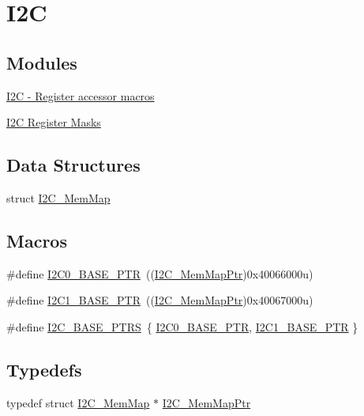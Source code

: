 \hypertarget{group___i2_c___peripheral}{}\section{I2\+C}
\label{group___i2_c___peripheral}
\subsection*{Modules}
\begin{DoxyCompactItemize}
\item 
\hyperlink{group___i2_c___register___accessor___macros}{I2\+C -\/ Register accessor macros}
\item 
\hyperlink{group___i2_c___register___masks}{I2\+C Register Masks}
\end{DoxyCompactItemize}
\subsection*{Data Structures}
\begin{DoxyCompactItemize}
\item 
struct \hyperlink{struct_i2_c___mem_map}{I2\+C\+\_\+\+Mem\+Map}
\end{DoxyCompactItemize}
\subsection*{Macros}
\begin{DoxyCompactItemize}
\item 
\#define \hyperlink{group___i2_c___peripheral_ga6db92fda81fa3b6a1c8c6a85e66d51a0}{I2\+C0\+\_\+\+B\+A\+S\+E\+\_\+\+P\+T\+R}~((\hyperlink{group___i2_c___peripheral_ga9902bc02a12982d0c37ec011b4dd89f0}{I2\+C\+\_\+\+Mem\+Map\+Ptr})0x40066000u)
\item 
\#define \hyperlink{group___i2_c___peripheral_gae13da5d584f2a4e2379db927a3f18772}{I2\+C1\+\_\+\+B\+A\+S\+E\+\_\+\+P\+T\+R}~((\hyperlink{group___i2_c___peripheral_ga9902bc02a12982d0c37ec011b4dd89f0}{I2\+C\+\_\+\+Mem\+Map\+Ptr})0x40067000u)
\item 
\#define \hyperlink{group___i2_c___peripheral_gaee17f364d6d1712b62774e6c33dea554}{I2\+C\+\_\+\+B\+A\+S\+E\+\_\+\+P\+T\+R\+S}~\{ \hyperlink{group___i2_c___peripheral_ga6db92fda81fa3b6a1c8c6a85e66d51a0}{I2\+C0\+\_\+\+B\+A\+S\+E\+\_\+\+P\+T\+R}, \hyperlink{group___i2_c___peripheral_gae13da5d584f2a4e2379db927a3f18772}{I2\+C1\+\_\+\+B\+A\+S\+E\+\_\+\+P\+T\+R} \}
\end{DoxyCompactItemize}
\subsection*{Typedefs}
\begin{DoxyCompactItemize}
\item 
typedef struct \hyperlink{struct_i2_c___mem_map}{I2\+C\+\_\+\+Mem\+Map} $\ast$ \hyperlink{group___i2_c___peripheral_ga9902bc02a12982d0c37ec011b4dd89f0}{I2\+C\+\_\+\+Mem\+Map\+Ptr}
\end{DoxyCompactItemize}


